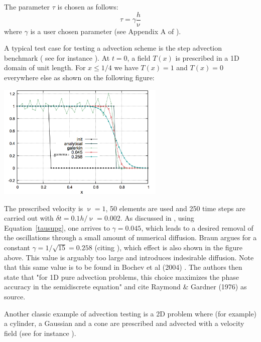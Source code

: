 The parameter $\tau$ is chosen as follows:
\begin{equation}
\tau=\gamma \frac{h}{\upnu} 
\label{tausupg}
\end{equation}
where $\gamma$ is a user chosen parameter (see Appendix A of \cite{thie11}). 

A typical test case for testing a advection scheme is the step advection benchmark (
see for instance \cite{dohu03}). At $t=0$, 
a field $T(x)$ is prescribed in a 1D domain of unit length. For $x\le 1/4$ we have $T(x)=1$ and 
$T(x)=0$ everywhere else as shown on the following figure:
\begin{center}
\includegraphics[width=8cm]{images/supg/fantom3}
\end{center}
The prescribed velocity is $\upnu=1$, 50 elements are used and 250 time steps are 
carried out with $\delta t=0.1h/\upnu=0.002$.
As discussed in \cite{thie11}, using Equation~\ref{tausupg}, 
one arrives to $\gamma=0.045$, which leads to a desired removal of the oscillations through a small
amount of numerical diffusion. Braun \cite{brau03} argues for a constant
$\gamma=1/\sqrt{15}=0.258$ (citing \cite{hubr82}), which effect is also shown in the figure above. This 
value is arguably too large and introduces indesirable diffusion. Note that this same value is 
to be found in Bochev et al (2004) \cite{bogs04}. The authors then state that 
"for 1D pure advection problems, this choice maximizes the phase accuracy in the semidiscrete
equation" and cite Raymond \& Gardner (1976) \cite{raga76} as source. 

Another classic example of advection testing is a 2D problem where (for example) a cylinder, a Gaussian 
and a cone are prescribed and advected with a velocity field (see for instance \cite{dohu03}). 

